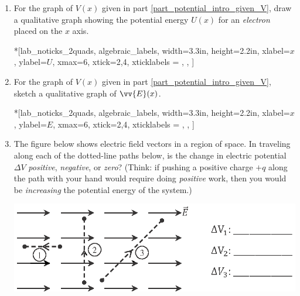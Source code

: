 \begin{enumerate}[labparts]
\item For the graph of $V(x)$ given in part \ref{part_potential_intro_given_V}, draw a qualitative graph showing the potential energy  $U(x)$ for an \textit{electron} placed on the $x$ axis.
\begin{lab_axis}*[lab_noticks_2quads,
	algebraic_labels,
	width={3.3in}, height={2.2in},
	xlabel={$x$},
	ylabel={$U$},
	xmax={6},
	xtick={2,4},
	xticklabels = { , },
	]
\end{lab_axis}

\item  For the graph of $V(x)$ given in part \ref{part_potential_intro_given_V}, sketch a qualitative graph of $\vv{E}(x)$.

\begin{lab_axis}*[lab_noticks_2quads,
	algebraic_labels,
	width={3.3in}, height={2.2in},
	xlabel={$x$},
	ylabel={$E$},
	xmax={6},
	xtick={2,4},
	xticklabels = { , },
	]
\end{lab_axis}

\pagebreak[3]
\item The figure below shows electric field vectors in a region of space.  In traveling  along each of the dotted-line paths below, is the change in electric potential $\Delta V$ \textit{positive},  \textit{negative}, or  \textit{zero}?  (Think: if pushing a positive charge $+q$ along the path with your hand would require doing \textit{positive} work, then you would  be \textit{increasing} the potential energy of the system.)
\begin{center}
\vspace{-0.1 in}
\includegraphics{potential_intro/activity_5_figs/uniform_E_field_1.eps}
\end{center}


\end{enumerate}
